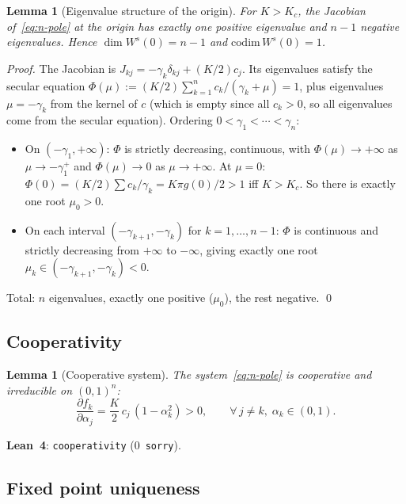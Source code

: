 \documentclass[11pt,a4paper]{article}
\newtheorem{lemma}[theorem]{Lemma}
\theoremstyle{definition}
\begin{document}
\begin{lemma}[Eigenvalue structure of the origin]\label{lem:origin}
For $K > K_c$, the Jacobian of~\eqref{eq:n-pole} at the origin has exactly one positive eigenvalue and $n-1$ negative eigenvalues. Hence $\dim W^s(0) = n-1$ and $\mathrm{codim}\,W^s(0) = 1$.
\end{lemma}

\begin{proof}
The Jacobian is $J_{kj} = -\gamma_k\delta_{kj} + (K/2)c_j$. Its eigenvalues satisfy the secular equation $\Phi(\mu) := (K/2)\sum_{k=1}^n c_k/(\gamma_k + \mu) = 1$, plus eigenvalues $\mu = -\gamma_k$ from the kernel of $c$ (which is empty since all $c_k > 0$, so all eigenvalues come from the secular equation). Ordering $0 < \gamma_1 < \cdots < \gamma_n$:

\begin{itemize}[leftmargin=2em]
\item On $(-\gamma_1, +\infty)$: $\Phi$ is strictly decreasing, continuous, with $\Phi(\mu) \to +\infty$ as $\mu \to -\gamma_1^+$ and $\Phi(\mu) \to 0$ as $\mu \to +\infty$. At $\mu = 0$: $\Phi(0) = (K/2)\sum c_k/\gamma_k = K\pi g(0)/2 > 1$ iff $K > K_c$. So there is exactly one root $\mu_0 > 0$.
\item On each interval $(-\gamma_{k+1}, -\gamma_k)$ for $k = 1, \ldots, n-1$: $\Phi$ is continuous and strictly decreasing from $+\infty$ to $-\infty$, giving exactly one root $\mu_k \in (-\gamma_{k+1}, -\gamma_k) < 0$.
\end{itemize}
Total: $n$ eigenvalues, exactly one positive ($\mu_0$), the rest negative. \qed
\end{proof}

\subsection{Cooperativity}

\begin{lemma}[Cooperative system]\label{lem:coop}
The system~\eqref{eq:n-pole} is cooperative and irreducible on $(0,1)^n$:
\[
\frac{\partial f_k}{\partial \alpha_j} = \frac{K}{2}\,c_j\,(1 - \alpha_k^2) > 0, \qquad \forall\,j \neq k,\;\alpha_k \in (0,1).
\]
\end{lemma}

\textbf{Lean~4}: \texttt{cooperativity} (0~\texttt{sorry}).

\subsection{Fixed point uniqueness}
\end{document}

